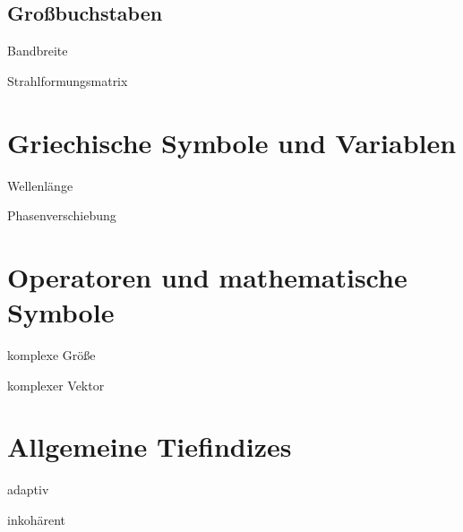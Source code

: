 \subsection*{Gro{\ss}buchstaben}
\begin{description}[leftmargin=\widthof{\textbf{XXXXXXX}\hspace{\labelsep}},style=nextline]
\item[$B$] Bandbreite
\item[$\mathbf{B}$] Strahlformungsmatrix
\end{description}


\clearpage

\section*{Griechische Symbole und Variablen}
\begin{description}[leftmargin=\widthof{\textbf{XXXXXXX}\hspace{\labelsep}},style=nextline]
\item[$\lambda$] Wellenl\"ange
\item[$\varphi$] Phasenverschiebung
\end{description}

\section*{Operatoren und mathematische Symbole}
\begin{description}[leftmargin=\widthof{\textbf{XXXXXXX}\hspace{\labelsep}},style=nextline]
\item[$a$] komplexe Gr\"o{\ss}e
\item[$\vec a$] komplexer Vektor
\end{description}


\section*{Allgemeine Tiefindizes}
\begin{description}[leftmargin=\widthof{\textbf{XXXXXXX}\hspace{\labelsep}},style=nextline]
\item[$\mathrm{adapt}$] adaptiv
\item[$\mathrm{inkoh}$] inkoh\"arent
\end{description}